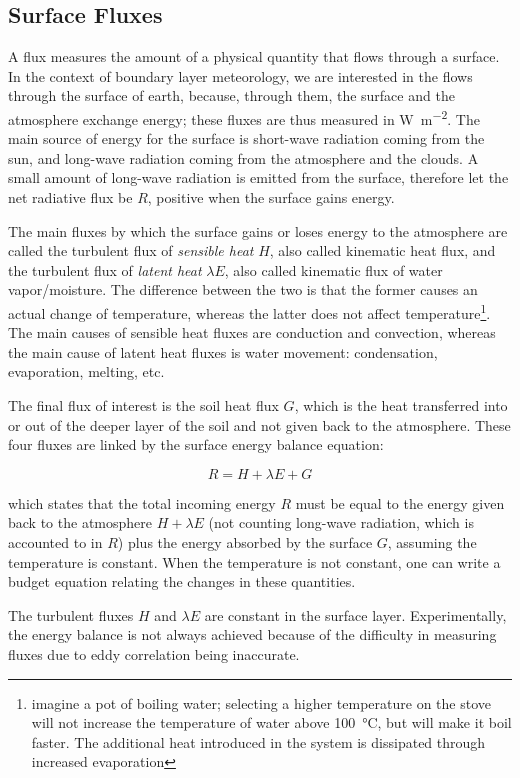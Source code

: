 \documentclass[a4paper]{book}
\begin{document}
\subsection{Surface Fluxes}
A flux measures the amount of a physical quantity that flows through a surface. In the context of boundary layer meteorology, we are interested in the flows through the surface of earth, because, through them, the surface and the atmosphere exchange energy; these fluxes are thus measured in \si{\watt\per\square\meter}. The main source of energy for the surface is short-wave radiation coming from the sun, and long-wave radiation coming from the atmosphere and the clouds. A small amount of long-wave radiation is emitted from the surface, therefore let the net radiative flux be $R$, positive when the surface gains energy.

The main fluxes by which the surface gains or loses energy to the atmosphere are called the turbulent flux of \emph{sensible heat} $H$, also called kinematic heat flux, and the turbulent flux of \emph{latent heat} $\lambda E$, also called kinematic flux of water vapor/moisture. The difference between the two is that the former causes an actual change of temperature, whereas the latter does not affect temperature\footnote{imagine a pot of boiling water; selecting a higher temperature on the stove will not increase the temperature of water above \SI{100}{\celsius}, but will make it boil faster. The additional heat introduced in the system is dissipated through increased evaporation}. The main causes of sensible heat fluxes are conduction and convection, whereas the main cause of latent heat fluxes is water movement: condensation, evaporation, melting, etc. 

The final flux of interest is the soil heat flux $G$, which is the heat transferred into or out of the deeper layer of the soil and not given back to the atmosphere. These four fluxes are linked by the surface energy balance equation:

$$
R=H+\lambda E+G
$$

which states that the total incoming energy $R$ must be equal to the energy given back to the atmosphere $H+\lambda E$ (not counting long-wave radiation, which is accounted to in $R$) plus the energy absorbed by the surface $G$, assuming the temperature is constant. When the temperature is not constant, one can write a budget equation relating the changes in these quantities.

The turbulent fluxes $H$ and $\lambda E$ are constant in the surface layer. Experimentally, the energy balance is not always achieved \citep{cabauwinsitu} because of the difficulty in measuring fluxes due to eddy correlation being inaccurate.
\end{document}
